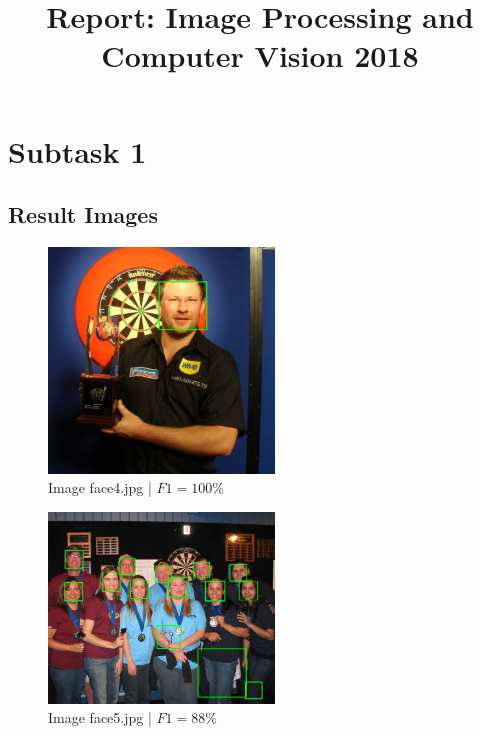 \documentclass[conference]{IEEEtran}
\begin{document}
\begin{titlepage}
\title{Report: Image Processing and Computer Vision 2018}

\author{
\and
{}
}
\maketitle
\end{titlepage}



\section{Subtask 1}

\subsection{Result Images}


\begin{figure}[ht!]
\centering
\includegraphics[width=60mm]{img/Viola_Jones_Faces/face_detection4.jpg}
\caption{Image face4.jpg | $F1 = 100\%$ \label{img_face_4}}
\end{figure}

\begin{figure}[ht!]
\centering
\includegraphics[width=60mm]{img/Viola_Jones_Faces/face_detection5.jpg}
\caption{Image face5.jpg | $F1 = 88\%$ \label{img_face_5}}
\end{figure}
\end{document}
